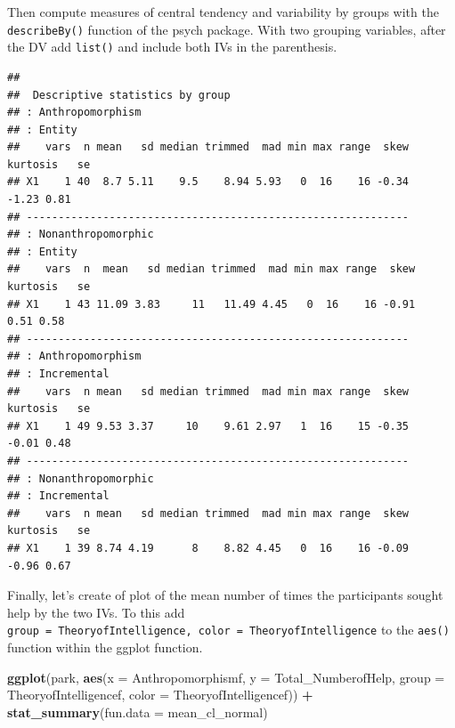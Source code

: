 \documentclass[
]{book}
\newenvironment{Shaded}{\begin{snugshade}}{\end{snugshade}}
\newcommand{\DataTypeTok}[1]{\textcolor[rgb]{0.13,0.29,0.53}{#1}}
\newcommand{\KeywordTok}[1]{\textcolor[rgb]{0.13,0.29,0.53}{\textbf{#1}}}
\newcommand{\NormalTok}[1]{#1}
\newcommand{\OperatorTok}[1]{\textcolor[rgb]{0.81,0.36,0.00}{\textbf{#1}}}
\newcommand{\StringTok}[1]{\textcolor[rgb]{0.31,0.60,0.02}{#1}}
\begin{document}
Then compute measures of central tendency and variability by groups with the \texttt{describeBy()} function of the psych package. With two grouping variables, after the DV add \texttt{list()} and include both IVs in the parenthesis.

\begin{Shaded}
\end{Shaded}

\begin{verbatim}
## 
##  Descriptive statistics by group 
## : Anthropomorphism
## : Entity
##    vars  n mean   sd median trimmed  mad min max range  skew kurtosis   se
## X1    1 40  8.7 5.11    9.5    8.94 5.93   0  16    16 -0.34    -1.23 0.81
## ------------------------------------------------------------ 
## : Nonanthropomorphic
## : Entity
##    vars  n  mean   sd median trimmed  mad min max range  skew kurtosis   se
## X1    1 43 11.09 3.83     11   11.49 4.45   0  16    16 -0.91     0.51 0.58
## ------------------------------------------------------------ 
## : Anthropomorphism
## : Incremental
##    vars  n mean   sd median trimmed  mad min max range  skew kurtosis   se
## X1    1 49 9.53 3.37     10    9.61 2.97   1  16    15 -0.35    -0.01 0.48
## ------------------------------------------------------------ 
## : Nonanthropomorphic
## : Incremental
##    vars  n mean   sd median trimmed  mad min max range  skew kurtosis   se
## X1    1 39 8.74 4.19      8    8.82 4.45   0  16    16 -0.09    -0.96 0.67
\end{verbatim}

Finally, let's create of plot of the mean number of times the participants sought help by the two IVs. To this add \texttt{group\ =\ TheoryofIntelligence,\ color\ =\ TheoryofIntelligence} to the \texttt{aes()} function within the ggplot function.

\begin{Shaded}
\begin{Highlighting}[]
\KeywordTok{ggplot}\NormalTok{(park, }\KeywordTok{aes}\NormalTok{(}\DataTypeTok{x =}\NormalTok{ Anthropomorphismf, }\DataTypeTok{y =}\NormalTok{ Total_NumberofHelp, }\DataTypeTok{group =}\NormalTok{ TheoryofIntelligencef, }\DataTypeTok{color =}\NormalTok{ TheoryofIntelligencef)) }\OperatorTok{+}
\StringTok{  }\KeywordTok{stat_summary}\NormalTok{(}\DataTypeTok{fun.data =}\NormalTok{ mean_cl_normal) }
\end{Highlighting}
\end{Shaded}
\end{document}
